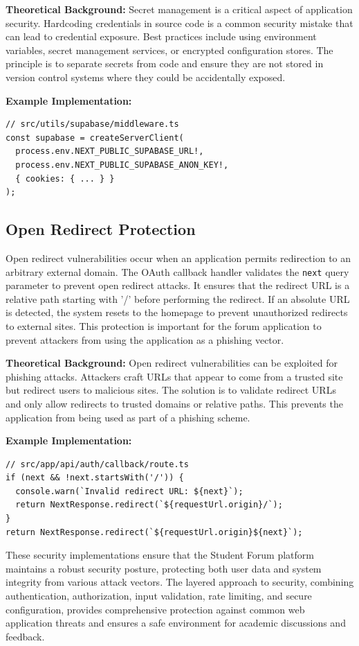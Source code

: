 \textbf{Theoretical Background:} Secret management is a critical aspect of application security. Hardcoding credentials in source code is a common security mistake that can lead to credential exposure. Best practices include using environment variables, secret management services, or encrypted configuration stores. The principle is to separate secrets from code and ensure they are not stored in version control systems where they could be accidentally exposed.

\textbf{Example Implementation:}
\begin{verbatim}
// src/utils/supabase/middleware.ts
const supabase = createServerClient(
  process.env.NEXT_PUBLIC_SUPABASE_URL!,
  process.env.NEXT_PUBLIC_SUPABASE_ANON_KEY!,
  { cookies: { ... } }
);
\end{verbatim}

\subsection{Open Redirect Protection}

Open redirect vulnerabilities occur when an application permits redirection to an arbitrary external domain. The OAuth callback handler validates the \texttt{next} query parameter to prevent open redirect attacks. It ensures that the redirect URL is a relative path starting with '/' before performing the redirect. If an absolute URL is detected, the system resets to the homepage to prevent unauthorized redirects to external sites. This protection is important for the forum application to prevent attackers from using the application as a phishing vector.

\textbf{Theoretical Background:} Open redirect vulnerabilities can be exploited for phishing attacks. Attackers craft URLs that appear to come from a trusted site but redirect users to malicious sites. The solution is to validate redirect URLs and only allow redirects to trusted domains or relative paths. This prevents the application from being used as part of a phishing scheme.

\textbf{Example Implementation:}
\begin{verbatim}
// src/app/api/auth/callback/route.ts
if (next && !next.startsWith('/')) {
  console.warn(`Invalid redirect URL: ${next}`);
  return NextResponse.redirect(`${requestUrl.origin}/`);
}
return NextResponse.redirect(`${requestUrl.origin}${next}`);
\end{verbatim}

These security implementations ensure that the Student Forum platform maintains a robust security posture, protecting both user data and system integrity from various attack vectors. The layered approach to security, combining authentication, authorization, input validation, rate limiting, and secure configuration, provides comprehensive protection against common web application threats and ensures a safe environment for academic discussions and feedback.
